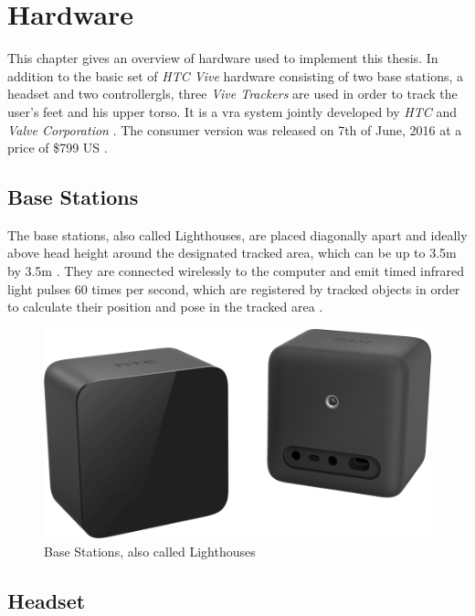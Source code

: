 
\chapter{Hardware}\label{chapter:Hardware}

This chapter gives an overview of hardware used to implement this thesis. In addition to the basic set of \textit{HTC Vive} hardware consisting of two base stations, a headset and two \glspl{controllergl},  three \textit{Vive Trackers} are used in order to track the user's feet and his upper torso. It is a \gls{vra} system jointly developed by \textit{HTC} and \textit{Valve Corporation} \autocite{htcValveVive}. The consumer version was released on 7th of June, 2016 at a price of \$799 US \autocite{htcShip}.


\section{Base Stations}

The base stations, also called Lighthouses, are placed diagonally apart and ideally above head height around the designated tracked area, which can be up to 3.5m by 3.5m \autocite{viveProductPage}. They are connected wirelessly to the computer and emit timed infrared light pulses 60 times per second, which are registered by tracked objects in order to calculate their position and pose in the tracked area \autocite{lighthouseHowWork}.
\begin{figure}[h]
    \centering
    \includegraphics[height=0.2\textheight]{figures/vive-hardware-base-stations.png}
    \caption{Base Stations, also called Lighthouses \autocite{viveProductPage}}
    \label{fig:lighthouse}
\end{figure}


\section{Headset}


